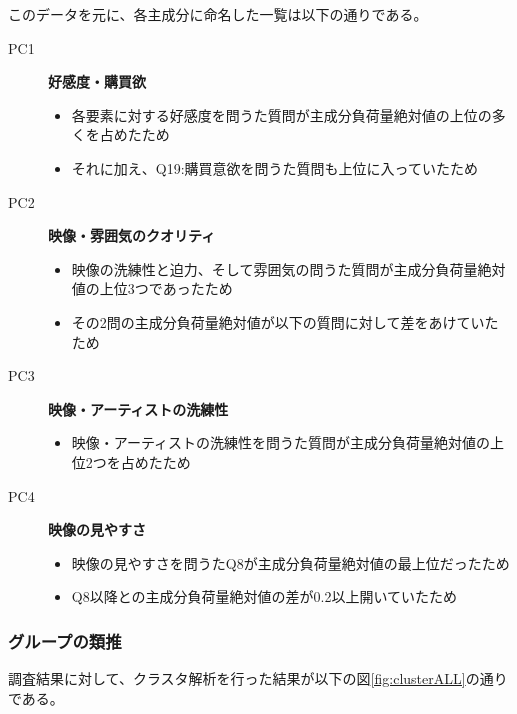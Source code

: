 \documentclass[11pt,a4paper, uplatex]{jsarticle}
\begin{document}
このデータを元に、各主成分に命名した一覧は以下の通りである。

\begin{description}
  \item[PC1] {\bf 好感度・購買欲}
  \begin{itemize}
    \item 各要素に対する好感度を問うた質問が主成分負荷量絶対値の上位の多くを占めたため
    \item それに加え、Q19:購買意欲を問うた質問も上位に入っていたため
  \end{itemize}

  \item[PC2] {\bf 映像・雰囲気のクオリティ}
  \begin{itemize}
    \item 映像の洗練性と迫力、そして雰囲気の問うた質問が主成分負荷量絶対値の上位3つであったため
    \item その2問の主成分負荷量絶対値が以下の質問に対して差をあけていたため
  \end{itemize}

  \item[PC3] {\bf 映像・アーティストの洗練性}
  \begin{itemize}
    \item 映像・アーティストの洗練性を問うた質問が主成分負荷量絶対値の上位2つを占めたため
  \end{itemize}

  \item[PC4] {\bf 映像の見やすさ}
  \begin{itemize}
    \item 映像の見やすさを問うたQ8が主成分負荷量絶対値の最上位だったため
    \item Q8以降との主成分負荷量絶対値の差が0.2以上開いていたため
  \end{itemize}
\end{description}

\subsubsection{グループの類推}
調査結果に対して、クラスタ解析を行った結果が以下の図\ref{fig:clusterALL}の通りである。
\end{document}
